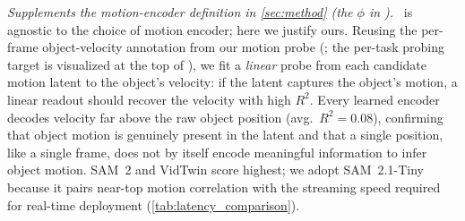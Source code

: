 \emph{Supplements the motion-encoder definition in \cref{sec:method} (the $\phi$ in \TEMPOMOT).}
\ours\ is agnostic to the choice of motion encoder; here we justify ours. Reusing the per-frame object-velocity annotation from our motion probe (; the per-task probing target is visualized at the top of ), we fit a \emph{linear} probe from each candidate motion latent to the object's velocity: if the latent captures the object's motion, a linear readout should recover the velocity with high $R^2$. Every learned encoder decodes velocity far above the raw object position (avg.\ $R^2 = 0.08$), confirming that object motion is genuinely present in the latent and that a single position, like a single frame, does not by itself encode meaningful information to infer object motion. SAM~2 and VidTwin score highest; we adopt SAM~2.1-Tiny because it pairs near-top motion correlation with the streaming speed required for real-time deployment (\cref{tab:latency_comparison}).
